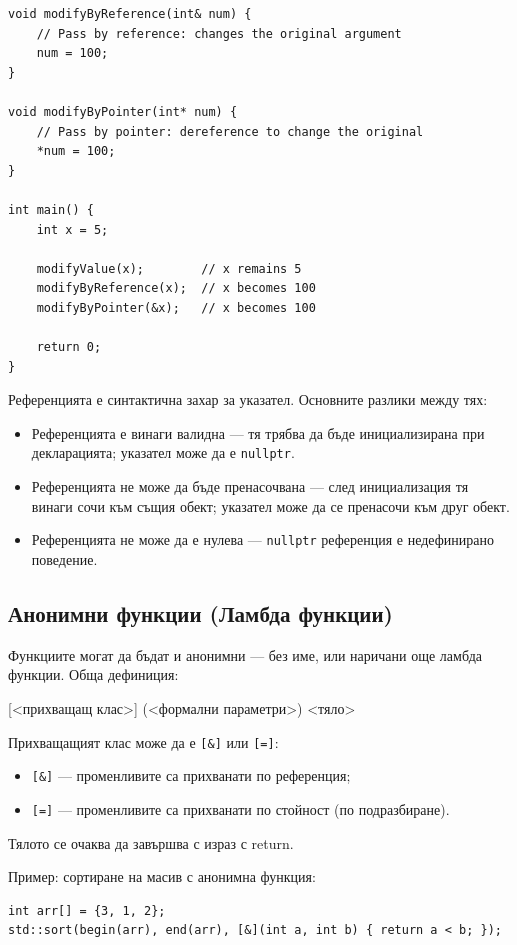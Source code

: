 \documentclass{scrartcl}
\begin{document}
\begin{FlushLeft}
\begin{lstlisting}
void modifyByReference(int& num) {
    // Pass by reference: changes the original argument
    num = 100;
}

void modifyByPointer(int* num) {
    // Pass by pointer: dereference to change the original
    *num = 100;
}

int main() {
    int x = 5;

    modifyValue(x);        // x remains 5
    modifyByReference(x);  // x becomes 100
    modifyByPointer(&x);   // x becomes 100

    return 0;
}
\end{lstlisting}
Референцията е синтактична захар за указател. Основните разлики между тях:
\begin{itemize}
    \item Референцията е винаги валидна --- тя трябва да бъде инициализирана при декларацията; указател може да е \texttt{nullptr}.
    \item Референцията не може да бъде пренасочвана --- след инициализация тя винаги сочи към същия обект; указател може да се пренасочи към друг обект.
    \item Референцията не може да е нулева --- \texttt{nullptr} референция е недефинирано поведение.
\end{itemize}

\subsection{Анонимни функции (Ламбда функции)}
Функциите могат да бъдат и анонимни --- без име, или наричани още ламбда функции. Обща дефиниция:

[<прихващащ клас>] (<формални параметри>) { <тяло> }

Прихващащият клас може да е \texttt{[\&]} или \texttt{[=]}:
\begin{itemize}
    \item \texttt{[\&]} --- променливите са прихванати по референция;
    \item \texttt{[=]} --- променливите са прихванати по стойност (по подразбиране).
\end{itemize}

Тялото се очаква да завършва с израз с return.

Пример: сортиране на масив с анонимна функция:
\begin{lstlisting}
int arr[] = {3, 1, 2};
std::sort(begin(arr), end(arr), [&](int a, int b) { return a < b; });
\end{lstlisting}


\end{FlushLeft}
\end{document}
